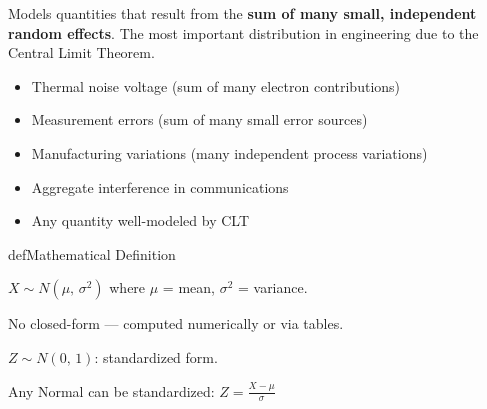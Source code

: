 

Models quantities that result from the \textbf{sum of many small, independent random effects}. The most important distribution in engineering due to the Central Limit Theorem.


\begin{itemize}
\tightlist
\item
  Thermal noise voltage (sum of many electron contributions)
\item
  Measurement errors (sum of many small error sources)
\item
  Manufacturing variations (many independent process variations)
\item
  Aggregate interference in communications
\item
  Any quantity well-modeled by CLT
\end{itemize}

\begin{PSbox}[unbreakable]{def}{Mathematical Definition}

$X \sim N(\mu,\, \sigma^{2})$ where $\mu$ = mean, $\sigma^{2}$ = variance.

\end{PSbox}





No closed-form — computed numerically or via tables.






$Z \sim N(0,\, 1)$: standardized form.

Any Normal can be standardized: $Z = \frac{X - \mu}{\sigma}$


